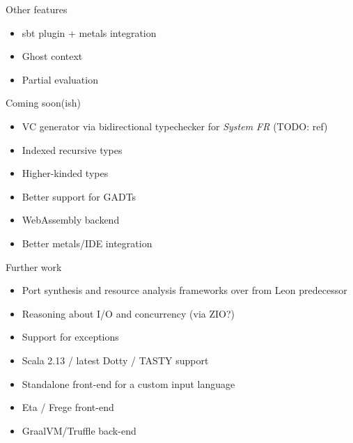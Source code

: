 \documentclass[
  ignorenonframetext,
]{beamer}
\providecommand{\tightlist}{%
  \setlength{\itemsep}{0pt}\setlength{\parskip}{0pt}}
\begin{document}
\begin{frame}{Other features}
\protect\hypertarget{other-features}{}

\begin{itemize}
\tightlist
\item
  sbt plugin + metals integration
\item
  Ghost context
\item
  Partial evaluation
\end{itemize}

\end{frame}

\begin{frame}{Coming soon(ish)}
\protect\hypertarget{coming-soonish}{}

\begin{itemize}
\tightlist
\item
  VC generator via bidirectional typechecker for \emph{System FR} (TODO:
  ref)
\item
  Indexed recursive types
\item
  Higher-kinded types
\item
  Better support for GADTs
\item
  WebAssembly backend
\item
  Better metals/IDE integration
\end{itemize}

\end{frame}

\begin{frame}{Further work}
\protect\hypertarget{further-work}{}

\begin{itemize}
\tightlist
\item
  Port synthesis and resource analysis frameworks over from Leon
  predecessor
\item
  Reasoning about I/O and concurrency (via ZIO?)
\item
  Support for exceptions
\item
  Scala 2.13 / latest Dotty / TASTY support
\item
  Standalone front-end for a custom input language
\item
  Eta / Frege front-end
\item
  GraalVM/Truffle back-end
\end{itemize}

\end{frame}
\end{document}
